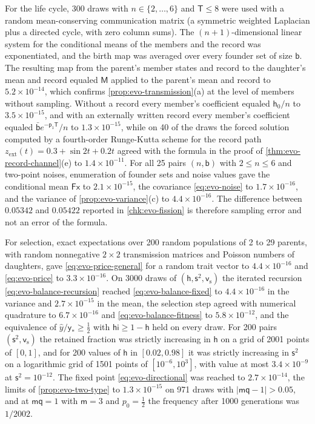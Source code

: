 \begin{numcheck}
For the life cycle, 300 draws with $n\in\{2,\dots,6\}$ and $\mathsf T\le8$ were used with a random mean-conserving communication matrix (a symmetric weighted Laplacian plus a directed cycle, with zero column sums). The $(n+1)$-dimensional linear system for the conditional means of the members and the record was exponentiated, and the birth map was averaged over every founder set of size $\mathsf b$. The resulting map from the parent's member states and record to the daughter's mean and record equaled $\mathsf M$ applied to the parent's mean and record to $5.2\times10^{-14}$, which confirms \cref{prop:evo-transmission}(a) at the level of members without sampling. Without a record every member's coefficient equaled $\mathsf h_0/n$ to $3.5\times10^{-15}$, and with an externally written record every member's coefficient equaled $\bar{\mathsf b}e^{-\mathsf p_1\mathsf T}/n$ to $1.3\times10^{-15}$, while on 40 of the draws the forced solution computed by a fourth-order Runge-Kutta scheme for the record path $z_{\mathrm{ext}}(t)=0.3+\sin2t+0.2t$ agreed with the formula in the proof of \cref{thm:evo-record-channel}(e) to $1.4\times10^{-11}$. For all 25 pairs $(n,\mathsf b)$ with $2\le n\le6$ and two-point noises, enumeration of founder sets and noise values gave the conditional mean $\mathsf F\mathsf x$ to $2.1\times10^{-15}$, the covariance \eqref{eq:evo-noise} to $1.7\times10^{-16}$, and the variance of \cref{prop:evo-variance}(c) to $4.4\times10^{-16}$. The difference between $0.05342$ and $0.05422$ reported in \cref{chk:evo-fission} is therefore sampling error and not an error of the formula.

For selection, exact expectations over 200 random populations of 2 to 29 parents, with random nonnegative $2\times2$ transmission matrices and Poisson numbers of daughters, gave \eqref{eq:evo-price-general} for a random trait vector to $4.4\times10^{-16}$ and \eqref{eq:evo-price} to $3.3\times10^{-16}$. On 3000 draws of $(\mathsf h,\mathsf s^2,\mathsf v_{\mathrm s})$ the iterated recursion \eqref{eq:evo-balance-recursion} reached \eqref{eq:evo-balance-fixed} to $4.4\times10^{-16}$ in the variance and $2.7\times10^{-15}$ in the mean, the selection step agreed with numerical quadrature to $6.7\times10^{-16}$ and \eqref{eq:evo-balance-fitness} to $5.8\times10^{-12}$, and the equivalence of $\hat y/\mathsf y_\ast\ge\frac12$ with $\mathsf h\mathsf i\ge1-\mathsf h$ held on every draw. For 200 pairs $(\mathsf s^2,\mathsf v_{\mathrm s})$ the retained fraction was strictly increasing in $\mathsf h$ on a grid of 2001 points of $[0,1]$, and for 200 values of $\mathsf h$ in $[0.02,0.98]$ it was strictly increasing in $\mathsf s^2$ on a logarithmic grid of 1501 points of $[10^{-6},10^3]$, with value at most $3.4\times10^{-9}$ at $\mathsf s^2=10^{-12}$. The fixed point \eqref{eq:evo-directional} was reached to $2.7\times10^{-14}$, the limits of \cref{prop:evo-two-type} to $1.3\times10^{-15}$ on 971 draws with $\lvert\mathsf m\mathsf q-1\rvert>0.05$, and at $\mathsf m\mathsf q=1$ with $\mathsf m=3$ and $p_0=\frac12$ the frequency after 1000 generations was $1/2002$.


\end{numcheck}

